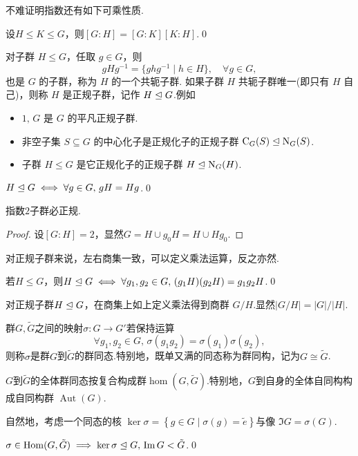 不难证明指数还有如下可乘性质.
\begin{prop}
	设$H\le K\le G$，则$[G:H]=[G:K][K:H]$.\qed
\end{prop}

对子群 $H\le G$，任取 $g\in G$，则
\[
	gHg^{-1}=\{ghg^{-1}\mid h\in H\},\quad\forall g\in G,
\]
也是 $G$ 的子群，称为 $H$ 的一个{\heiti 共轭子群}.
如果子群 $H$ 共轭子群唯一(即只有 $H$ 自己)，则称 $H$ 是{\heiti 正规子群}，记作 $H\trianglelefteq G$.例如
\begin{itemize}
	\item $1,\,G$ 是 $G$ 的平凡正规子群.
	\item 非空子集 $S\subseteq G$ 的中心化子是正规化子的正规子群 $\mathrm{C}_G(S)\trianglelefteq\mathrm{N}_G(S)$.
	\item 子群 $H\le G$ 是它正规化子的正规子群 $H\trianglelefteq\mathrm{N}_G(H)$.
\end{itemize}
\begin{lemma}
	$H\trianglelefteq G\iff\forall g\in G,\,gH=Hg$.\qed
\end{lemma}
\begin{cor}
	指数$2$子群必正规.
\end{cor}
\begin{proof}
	设$[G:H]=2$，显然$G=H\cup g_0H=H\cup Hg_0$.
\end{proof}

对正规子群来说，左右商集一致，可以定义乘法运算，反之亦然.
\begin{lemma}
	若$H\le G$，则$H\trianglelefteq G\iff\forall g_1,g_2\in G,\,(g_1H)(g_2H)=g_1g_2H$.\qed
\end{lemma}

对正规子群$H\trianglelefteq G$，在商集上如上定义乘法得到{\heiti 商群} $G/H$.显然$|G/H|=|G|/|H|$.

\begin{definition}
	群$G,\tilde{G}$之间的映射$\sigma\colon G\to G'$若保持运算
	\[
		\forall g_1,g_2\in G,\,\sigma(g_1g_2)=\sigma(g_1)\sigma(g_2),
	\]
	则称$\sigma$是群$G$到$\tilde{G}$的{\heiti 群同态}.特别地，既单又满的同态称为{\heiti 群同构}，记为$G\cong\tilde{G}$.

	$G$到$\tilde{G}$的全体群同态按复合构成群$\hom(G,\tilde{G})$.特别地，$G$到自身的全体自同构构成{\heiti 自同构群} $\operatorname*{Aut}(G)$.
\end{definition}

自然地，考虑一个同态的{\heiti 核} $\ker\sigma=\left\{g\in G\mid \sigma(g)=\tilde{e}\right\}$与{\heiti 像} $\Im G=\sigma(G)$.
\begin{prop}
	$\sigma\in\operatorname*{Hom}(G,\tilde{G})\implies\ker\sigma\trianglelefteq G,\,\operatorname*{Im} G<\tilde{G}$.\qed
\end{prop}

